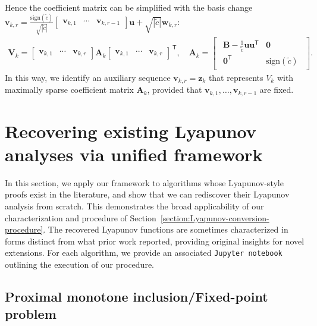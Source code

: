 \documentclass{article}
\theoremstyle{definition}
\theoremstyle{plain}
\newcommand{\vu}{{\mathbf{u}}}
\newcommand{\vv}{{\mathbf{v}}}
\newcommand{\vw}{{\mathbf{w}}}
\newcommand{\vz}{{\mathbf{z}}}
\newcommand{\vA}{{\mathbf{A}}}
\newcommand{\vB}{{\mathbf{B}}}
\newcommand{\vV}{{\mathbf{V}}}
\newcommand{\transpose}{\mathsf{T}}
\begin{document}
\endgroup
Hence the coefficient matrix can be simplified with the basis change 
$\vv_{k,r} = \frac{\mathrm{sign}(\tilde{c})}{\sqrt{|\tilde{c}|}} \begin{bmatrix}
    \vv_{k,1} & \cdots & \vv_{k,r-1}
\end{bmatrix} \vu + \sqrt{|\tilde{c}|} \vw_{k,r}$:
\begingroup
\setlength{\arraycolsep}{8pt}
\renewcommand{\arraystretch}{1.2}
\begin{align*}
    \vV_k = \begin{bmatrix} \vv_{k,1} & \cdots & \vv_{k,r} \end{bmatrix} \vA_k \begin{bmatrix} \vv_{k,1} & \cdots & \vv_{k,r} \end{bmatrix}^{\,\transpose} ,
     \quad \vA_k = \begin{bmatrix}
    \begin{array}{c|c}
        \vB - \frac{1}{\tilde{c}}\vu\vu^\transpose & \mathbf{0} \\
        \hline
        \mathbf{0}^\transpose & \mathrm{sign}(\tilde{c})
    \end{array}
    \end{bmatrix} .
\end{align*}
\endgroup
In this way, we identify an auxiliary sequence $\vv_{k,r} = \vz_k$ that represents $V_k$ with maximally sparse coefficient matrix $\vA_k$,
provided that $\vv_{k,1}, \dots, \vv_{k,r-1}$ are fixed.

\section{Recovering existing Lyapunov analyses via unified framework}
\label{section:existing-lyapunov}

In this section, we apply our framework to algorithms whose Lyapunov-style proofs exist in the literature,
and show that we can rediscover their Lyapunov analysis from scratch.
This demonstrates the broad applicability of our characterization and procedure of Section~\ref{section:Lyapunov-conversion-procedure}.
The recovered Lyapunov functions are sometimes characterized in forms distinct from what prior work reported, providing original insights for novel extensions.
For each algorithm, we provide an associated \texttt{Jupyter notebook} outlining the execution of our procedure.

\subsection{Proximal monotone inclusion/Fixed-point problem}
\label{section:recovering-proximal-monotone}
\end{document}
